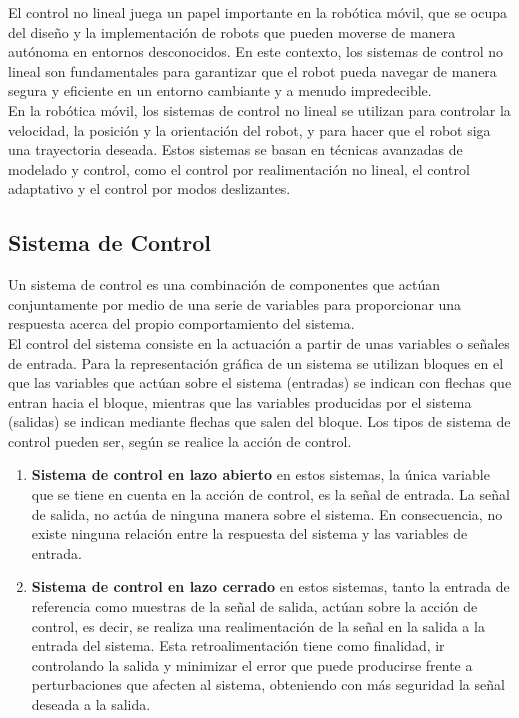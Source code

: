 \documentclass[oneside,onecolumn]{article}
\begin{document}
El control no lineal juega un papel importante en la robótica móvil, que se ocupa del diseño y la implementación de robots que pueden moverse de manera autónoma en entornos desconocidos. En este contexto, los sistemas de control no lineal son fundamentales para garantizar que el robot pueda navegar de manera segura y eficiente en un entorno cambiante y a menudo impredecible.\\

En la robótica móvil, los sistemas de control no lineal se utilizan para controlar la velocidad, la posición y la orientación del robot, y para hacer que el robot siga una trayectoria deseada. Estos sistemas se basan en técnicas avanzadas de modelado y control, como el control por realimentación no lineal, el control adaptativo y el control por modos deslizantes.\\

\subsection{Sistema de Control} %

Un sistema de control es una combinación de componentes que actúan conjuntamente por medio de una serie de variables para proporcionar una respuesta acerca del propio comportamiento del sistema.\\

El control del sistema consiste en la actuación a partir de unas variables o señales de entrada. Para la representación gráfica de un sistema se utilizan bloques en el que las variables que actúan sobre el sistema (entradas) se indican con flechas que entran hacia el bloque, mientras que las variables producidas por el sistema (salidas) se indican mediante flechas que salen del bloque. Los tipos de sistema de control pueden ser, según se realice la acción de control.\\

\begin{enumerate}
\item \textbf{Sistema de control en lazo abierto} en estos sistemas, la única variable que se tiene en cuenta en la acción de control, es la señal de entrada. La señal de salida, no actúa de ninguna manera sobre el sistema. En consecuencia, no existe ninguna relación entre la respuesta del sistema y las variables de entrada.
\item \textbf{Sistema de control en lazo cerrado} en estos sistemas, tanto la entrada de referencia como muestras de la señal de salida, actúan sobre la acción de control, es decir, se realiza una realimentación de la señal en la salida a la entrada del sistema. Esta retroalimentación tiene como finalidad, ir controlando la salida y minimizar el error que puede producirse frente a perturbaciones que afecten al sistema, obteniendo con más seguridad la señal deseada a la salida.
\end{enumerate}
\end{document}
